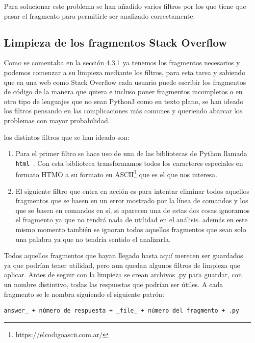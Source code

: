 \documentclass[a4paper, 12pt]{book}
\begin{document}
Para solucionar este problema se han añadido varios filtros por los que tiene que pasar el fragmento para permitirle ser analizado correctamente.

\subsection{Limpieza de los fragmentos Stack Overflow}

Como se comentaba en la sección 4.3.1 ya tenemos los fragmentos necesarios y podemos comenzar a su limpieza mediante los filtros, para esta tarea y sabiendo que en una web como Stack Overflow cada usuario puede escribir los fragmentos de código de la manera que quiera e incluso poner fragmentos incompletos o en otro tipo de lenguajes que no sean Python3 como en texto plano, se han ideado los filtros pensando en las complicaciones más comunes y queriendo abarcar los problemas con mayor probabilidad.

los distintos filtros que se han ideado son:

\begin{enumerate}
	\item Para el primer filtro se hace uso de una de las bibliotecas de Python llamada \texttt{html}~\cite{website:libreriahtml}. Con esta biblioteca transformamos todos los caracteres especiales en formato HTMO a su formato en ASCII\footnote{https://elcodigoascii.com.ar/} que es el que nos interesa.
	\item El siguiente filtro que entra en acción es para intentar eliminar todos aquellos fragmentos que se basen en un error mostrado por la línea de comandos y los que se basen en comandos en sí, si aparecen una de estas dos cosas ignoramos el fragmento ya que no tendrá nada de utilidad en el análisis. además en este mismo momento también se ignoran todos aquellos fragmentos que sean solo una palabra ya que no tendría sentido el analizarla.
\end{enumerate}

Todos aquellos fragmentos que hayan llegado hasta aquí merecen ser guardados ya que podrían tener utilidad, pero aun quedan algunos filtros de limpieza que aplicar. Antes de seguir con la limpieza se crean archivos .py para guardar, con un nombre distintivo, todas las respuestas que podrían ser útiles. A cada fragmento se le nombra siguiendo el siguiente patrón:

\begin{verbatim}
answer_ + número de respuesta + _file_ + número del fragmento + .py
\end{verbatim}
\end{document}
